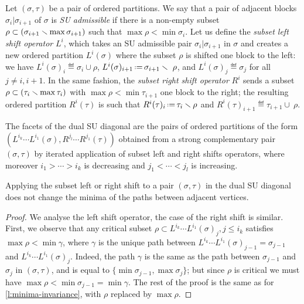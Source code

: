 Let $(\sigma,\tau)$ be a pair of ordered partitions.
We say that a pair of adjacent blocks $\sigma_i | \sigma_{i+1}$ of $\sigma$ is \emph{SU admissible} if there is a non-empty subset $\rho \subset (\sigma_{i+1} \smallsetminus \max\sigma_{i+1})$ such that $\max \rho < \min \sigma_{i}$. 
Let us define the \emph{subset left shift operator} $L^i$, which takes an SU admissible pair $\sigma_i | \sigma_{i+1}$ in $\sigma$ and creates a new ordered partition $L^i(\sigma)$ where the subset $\rho$ is shifted one block to the left: we have $L^i(\sigma)_i  \eqdef  \sigma_i \cup \rho$, $L^i(\sigma)_{i+1}  \eqdef  \sigma_{i+1} \ssm \ \rho$, and $L^i(\sigma)_{j} \eqdef \sigma_j$ for all $j\neq i, i+1$. 
In the same fashion, the \emph{subset right shift operator} $R^i$ sends a subset $\rho \subset (\tau_{i} \smallsetminus \max\tau_{i})$ with $\max \rho < \min \tau_{i+1}$ one block to the right; the resulting ordered partition $R^i(\tau)$ is such that $R^i(\tau)_i  \eqdef  \tau_i \ssm \rho$ and $R^i(\tau)_{i+1}  \eqdef  \tau_{i+1} \cup \ \rho$.


\begin{definition}\label{def: Dual SU diagonal, second definition}
    The facets of the dual SU diagonal are the pairs of ordered partitions of the form $(L^{i_k}\cdots L^{i_1}(\sigma), R^{j_l}\cdots R^{j_1}(\tau))$ obtained from a strong complementary pair $(\sigma,\tau)$ by iterated application of subset left and right shifts operators, where moreover $i_1 > \cdots > i_k$ is decreasing and $j_1 < \cdots < j_l$ is increasing. 
\end{definition}

\begin{lemma}
\label{l:minima-invariance-subset}
    Applying the subset left or right shift to a pair $(\sigma,\tau)$ in the dual SU diagonal does not change the minima of the paths between adjacent vertices. 
\end{lemma}

\begin{proof}
    We analyse the left shift operator, the case of the right shift is similar. 
    First, we observe that any critical subset $\rho \subset L^{i_k}\cdots L^{i_1}(\sigma)_j, j \leq i_k$ satisfies $\max \rho < \min \gamma$, where $\gamma$ is the unique path between $L^{i_k}\cdots L^{i_1}(\sigma)_{j-1}=\sigma_{j-1}$ and $L^{i_k}\cdots L^{i_1}(\sigma)_j$. 
    Indeed, the path $\gamma$ is the same as the path between $\sigma_{j-1}$ and $\sigma_{j}$ in $(\sigma,\tau)$, and is equal to $\{\min \sigma_{j-1}, \max \sigma_j\}$; but since $\rho$ is critical we must have $\max \rho < \min \sigma_{j-1}=\min \gamma$. 
    The rest of the proof is the same as for \cref{l:minima-invariance}, with $\rho$ replaced by $\max \rho$. 
\end{proof}

